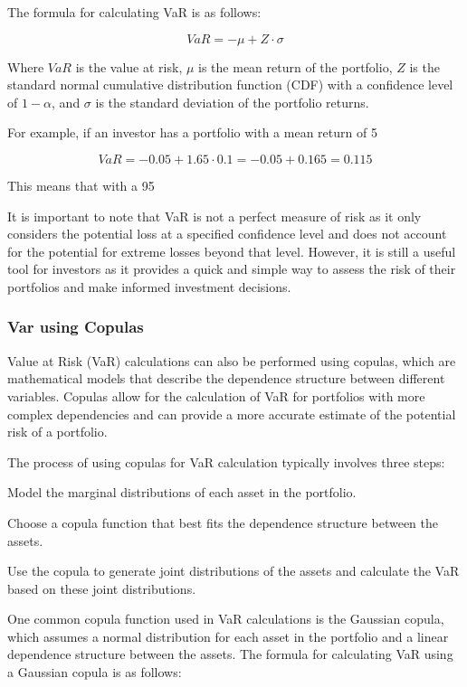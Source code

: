 \documentclass[12pt, a4paper, oneside]{article}
\begin{document}
The formula for calculating VaR is as follows:

$$VaR = -\mu + Z\cdot \sigma$$

Where $VaR$ is the value at risk, $\mu$ is the mean return of the portfolio, $Z$ is the standard normal cumulative distribution function (CDF) with a confidence level of $1-\alpha$, and $\sigma$ is the standard deviation of the portfolio returns.

For example, if an investor has a portfolio with a mean return of 5%

$$VaR = -0.05 + 1.65\cdot 0.1 = -0.05 + 0.165 = 0.115$$

This means that with a 95%

It is important to note that VaR is not a perfect measure of risk as it only considers the potential loss at a specified confidence level and does not account for the potential for extreme losses beyond that level. However, it is still a useful tool for investors as it provides a quick and simple way to assess the risk of their portfolios and make informed investment decisions.
\subsubsection{Var using Copulas }
Value at Risk (VaR) calculations can also be performed using copulas, which are mathematical models that describe the dependence structure between different variables. Copulas allow for the calculation of VaR for portfolios with more complex dependencies and can provide a more accurate estimate of the potential risk of a portfolio.

The process of using copulas for VaR calculation typically involves three steps:

Model the marginal distributions of each asset in the portfolio.

Choose a copula function that best fits the dependence structure between the assets.

Use the copula to generate joint distributions of the assets and calculate the VaR based on these joint distributions.

One common copula function used in VaR calculations is the Gaussian copula, which assumes a normal distribution for each asset in the portfolio and a linear dependence structure between the assets. The formula for calculating VaR using a Gaussian copula is as follows:
\end{document}
